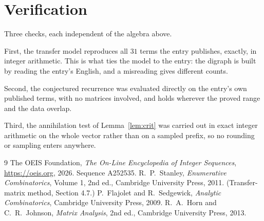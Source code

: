 \documentclass[11pt,a4paper]{article}
\theoremstyle{plain}
\theoremstyle{definition}
\begin{document}
\section{Verification}

Three checks, each independent of the algebra above.

First, the transfer model reproduces all $31$ terms the entry publishes, exactly, in
integer arithmetic. This is what ties the model to the entry: the digraph is built by reading
the entry's English, and a misreading gives different counts.

Second, the conjectured recurrence was evaluated directly on the entry's own published terms,
with no matrices involved, and holds wherever the proved range and the data overlap.

Third, the annihilation test of Lemma~\ref{lem:crit} was carried out in exact integer
arithmetic on the whole vector rather than on a sampled prefix, so no rounding or sampling
enters anywhere.

\begin{thebibliography}{9}
 The OEIS Foundation, \emph{The On-Line Encyclopedia of Integer
Sequences}, \url{https://oeis.org}, 2026. Sequence A252535.
 R.~P.~Stanley, \emph{Enumerative Combinatorics}, Volume 1, 2nd ed.,
Cambridge University Press, 2011. (Transfer-matrix method, Section 4.7.)
 P.~Flajolet and R.~Sedgewick, \emph{Analytic Combinatorics}, Cambridge
University Press, 2009.
 R.~A.~Horn and C.~R.~Johnson, \emph{Matrix Analysis}, 2nd ed., Cambridge
University Press, 2013.
\end{thebibliography}
\end{document}
